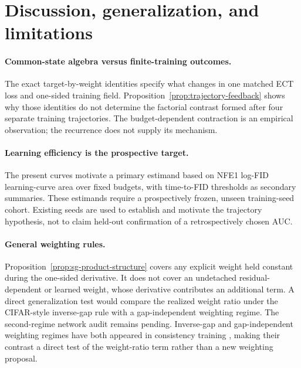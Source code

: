 \documentclass{article}
\newif\ifshowcomments
\newcommand{\claimnote}[1]{%
  \ifshowcomments{\color{claimpurple}\textbf{[CLAIM CEILING: #1]}}\fi}
\begin{document}
\claimnote{Keep this section compact. PR65 is a next-update diagnostic and
PR66 is a NO-GO result. Neither is endpoint mechanism closure.}

\section{Discussion, generalization, and limitations}
\label{sec:discussion}

\paragraph{Common-state algebra versus finite-training outcomes.}
The exact target-by-weight identities specify what changes in one matched ECT
loss and one-sided training field. Proposition~\ref{prop:trajectory-feedback}
shows why those identities do not determine the factorial contrast formed after
four separate training trajectories. The budget-dependent contraction is an
empirical observation; the recurrence does not supply its mechanism.

\paragraph{Learning efficiency is the prospective target.}
The present curves motivate a primary estimand based on NFE1 log-FID
learning-curve area over fixed budgets, with time-to-FID thresholds as
secondary summaries. These estimands require a prospectively frozen, unseen
training-seed cohort. Existing seeds are used to establish and motivate the
trajectory hypothesis, not to claim held-out confirmation of a retrospectively
chosen AUC.

\paragraph{General weighting rules.}
Proposition~\ref{prop:sg-product-structure} covers any explicit weight held
constant during the one-sided derivative. It does not cover an undetached
residual-dependent or learned weight, whose derivative contributes an
additional term. A direct generalization test would compare the realized
weight ratio under the CIFAR-style inverse-gap rule with a gap-independent
weighting regime. The second-regime network audit remains pending.
Inverse-gap and gap-independent weighting regimes have both appeared in
consistency training \citep{geng2024consistency,silvestri2025vct}, making their
contrast a direct
test of the weight-ratio term rather than a new weighting proposal.
\end{document}

